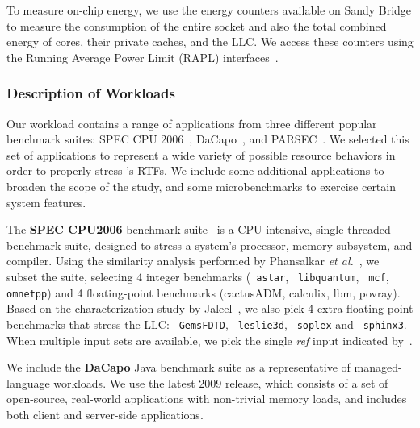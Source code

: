 To measure on-chip energy, we use the energy counters available on
Sandy Bridge to measure the consumption of  the entire socket and also
the total combined energy of cores, their private caches, and the
LLC. We access these counters using the Running Average Power Limit
(RAPL) interfaces~\cite{Intel:Manual2012}.  %


\subsubsection{Description of Workloads}

Our workload contains a range of applications from three different
popular benchmark suites: SPEC CPU 2006~\cite{SPEC2006},
DaCapo~\cite{dacapo}, and PARSEC~\cite{parsec}. We selected this set of applications to represent a wide variety of possible resource behaviors in order to properly stress \pacora's RTFs. We include some additional applications to broaden the
scope of the study, and some microbenchmarks to exercise certain
system features.

The \textbf{SPEC CPU2006} benchmark suite~\cite{SPEC2006} is a
CPU-intensive, single-threaded benchmark suite, designed to stress a
system's processor, memory subsystem, and compiler.  Using the
similarity analysis performed by Phansalkar \emph{et
al.}~\cite{Phansalkar:ISCA2007}, we subset the suite, selecting 4
integer benchmarks (\texttt{ astar}, \texttt{ libquantum}, \texttt{ mcf}, \texttt{ omnetpp}) and 4
floating-point benchmarks (cactusADM, calculix, lbm, povray).  Based
on the characterization study by Jaleel~\cite{Jaleel:TR2007}, we also
pick 4 extra floating-point benchmarks that stress the LLC: \texttt{ GemsFDTD},
\texttt{ leslie3d}, \texttt{ soplex} and \texttt{ sphinx3}.  When multiple input sets are
available, we pick the single \textit{ref} input indicated by~\cite{Phansalkar:ISCA2007}.

We include the \textbf{DaCapo} Java benchmark suite as a
representative of managed-language workloads. We use the latest 2009 release, which consists of a set of open-source, real-world
applications with non-trivial memory loads, and includes both client and
server-side applications.

